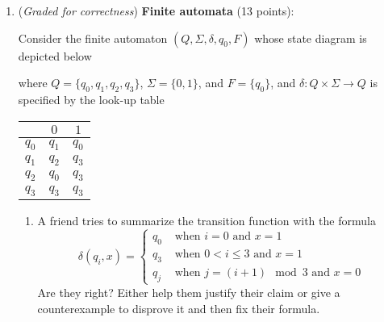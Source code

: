 \documentclass[12pt, oneside]{article}
\newcommand{\gradeCorrect}{({\it Graded for correctness}) }
\begin{document}
\begin{enumerate}[wide, labelwidth=!, labelindent=0pt]
\item\gradeCorrect \textbf{Finite automata} (13 points):

Consider the finite automaton $(Q, \Sigma, \delta, q_0, F)$ whose state diagram is depicted below
\begin{center}
\end{center}
where $Q = \{q_0, q_1, q_2, q_3\}$, $\Sigma = \{0,1\}$, and $F = \{q_0\}$, and $\delta: Q \times \Sigma \to Q$
is specified by the look-up table
\begin{center}
\begin{tabular}{c|cc}
        & $0$ & $1$ \\
    \hline
  $q_0$ & $q_1$ & $q_0$ \\
  $q_1$ & $q_2$ & $q_3$ \\
  $q_2$ & $q_0$ & $q_3$ \\
  $q_3$ & $q_3$ & $q_3$
\end{tabular}
\end{center}
    \begin{enumerate}
    \item  A friend tries to summarize the transition function with the formula
    \[
        \delta(q_i,x) = \begin{cases}
            q_0 &\text{ when $i=0$ and $x=1$} \\
            q_3 &\text{ when $0<i\leq 3$ and $x=1$}\\
            q_j &\text{ when $j = (i+1) \mod 3$ and $x=0$}
        \end{cases}
    \]
    Are they right? Either help them justify their claim or give a counterexample to disprove it and then 
    fix their formula.


\end{enumerate}
\end{enumerate}
\end{document}

